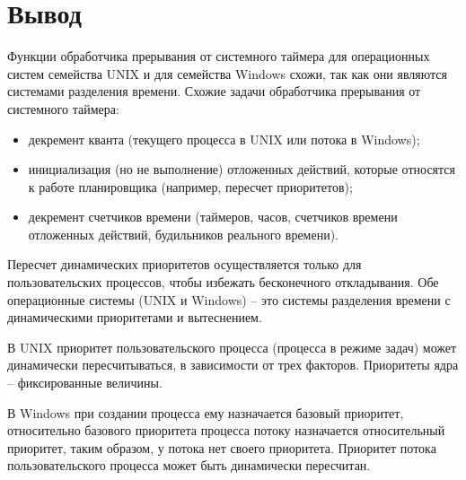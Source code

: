 \chapter{Вывод}
Функции обработчика прерывания от системного таймера для операционных систем семейства UNIX и для семейства Windows схожи, так как они являются системами разделения времени. Схожие задачи обработчика прерывания от системного таймера:
\begin{itemize}
	\item декремент кванта (текущего процесса в UNIX или потока в Windows);
	\item инициализация (но не выполнение) отложенных действий, которые относятся к работе планировщика (например, пересчет приоритетов);
	\item декремент счетчиков времени (таймеров, часов, счетчиков времени отложенных действий, будильников реального времени).
\end{itemize}

Пересчет динамических приоритетов осуществляется только для пользовательских процессов, чтобы избежать бесконечного откладывания.  Обе операционные системы (UNIX и Windows) -- это системы разделения времени с динамическими приоритетами и вытеснением.

В UNIX приоритет пользовательского процесса (процесса в режиме задач) может динамически пересчитываться, в зависимости от трех факторов. Приоритеты ядра – фиксированные величины.

В Windows при создании процесса ему назначается базовый приоритет, относительно базового приоритета процесса потоку назначается относительный приоритет, таким образом, у потока нет своего приоритета. Приоритет потока пользовательского процесса может быть динамически
пересчитан.